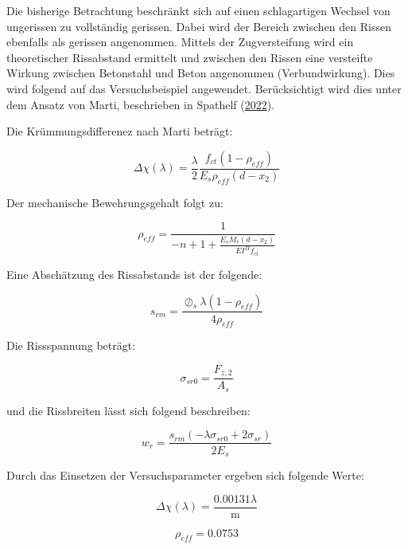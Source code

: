 \documentclass[
  letterpaper,
]{scrreprt}
\begin{document}
Die bisherige Betrachtung beschränkt sich auf einen schlagartigen
Wechsel von ungerissen zu vollständig gerissen. Dabei wird der Bereich
zwischen den Rissen ebenfalls als gerissen angenommen. Mittels der
Zugversteifung wird ein theoretischer Rissabstand ermittelt und zwischen
den Rissen eine versteifte Wirkung zwischen Betonstahl und Beton
angenommen (Verbundwirkung). Dies wird folgend auf das Versuchsbeispiel
angewendet. Berücksichtigt wird dies unter dem Ansatz von Marti,
beschrieben in Spathelf (\protect\hyperlink{ref-Spathelf2022}{2022}).

Die Krümmungsdifferenez nach Marti beträgt:

\begin{equation}\Delta\chi{\left(\lambda \right)} = \frac{\lambda}{2} \frac{f_{ct} \left(1 - \rho_{eff}\right)}{E_{s} \rho_{eff} \left(d - x_{2}\right)}\end{equation}

Der mechanische Bewehrungsgehalt folgt zu:

\begin{equation}\rho_{eff} = \frac{1}{- n + 1 + \frac{E_{s} M_{r} \left(d - x_{2}\right)}{EI^{II} f_{ct}}}\end{equation}

Eine Abschätzung des Rissabstands ist der folgende:

\begin{equation}s_{rm} = \frac{\oslash_{s} \lambda \left(1 - \rho_{eff}\right)}{4 \rho_{eff}}\end{equation}

Die Rissspannung beträgt:

\begin{equation}\sigma_{sr0} = \frac{F_{z,2}}{A_{s}}\end{equation}

und die Rissbreiten lässt sich folgend beschreiben:

\begin{equation}w_{r} = \frac{s_{rm} \left(- \lambda \sigma_{sr0} + 2 \sigma_{sr}\right)}{2 E_{s}}\end{equation}

Durch das Einsetzen der Versuchsparameter ergeben sich folgende Werte:

\begin{equation}\Delta\chi{\left(\lambda \right)} = \frac{0.00131 \lambda}{\text{m}}\end{equation}

\begin{equation}\rho_{eff} = 0.0753\end{equation}
\end{document}
